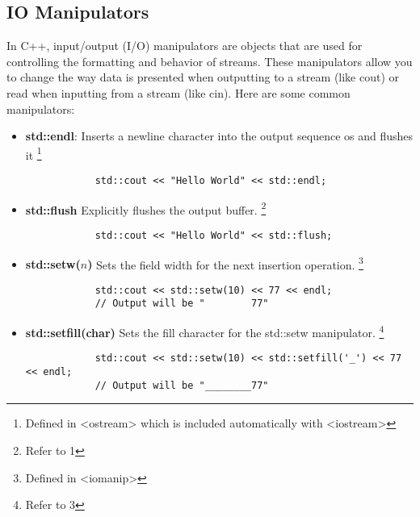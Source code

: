 \documentclass{report}
\begin{document}
    \subsection{IO Manipulators}
    \bigbreak \noindent 
    In C++, input/output (I/O) manipulators are objects that are used for controlling the formatting and behavior of streams. These manipulators allow you to change the way data is presented when outputting to a stream (like cout) or read when inputting from a stream (like cin).
    \bigbreak \noindent 
    Here are some common manipulators:
    \begin{itemize}
        \item \textbf{std::endl}:  Inserts a newline character into the output sequence os and flushes it \footnote{Defined in <ostream> which is included automatically with <iostream>}
            \smallbreak
            \sepline
            \begin{verbatim}
            std::cout << "Hello World" << std::endl;
            \end{verbatim}
            \sepline
        \item \textbf{std::flush}  Explicitly flushes the output buffer. \footnote{Refer to 1}
            \smallbreak
            \sepline
            \begin{verbatim}
            std::cout << "Hello World" << std::flush;
            \end{verbatim}
            \sepline
        \item \textbf{std::setw($n$)} Sets the field width for the next insertion operation. \footnote{Defined in <iomanip>}
            \smallbreak
            \sepline
            \begin{verbatim}
            std::cout << std::setw(10) << 77 << endl; 
            // Output will be "        77"
            \end{verbatim}
            \sepline
        \item \textbf{std::setfill(char)} Sets the fill character for the std::setw manipulator. \footnote{Refer to 3}
            \smallbreak
            \sepline
            \begin{verbatim}
            std::cout << std::setw(10) << std::setfill('_') << 77 << endl; 
            // Output will be "________77"
            \end{verbatim}
            \sepline


\end{itemize}
\end{document}

